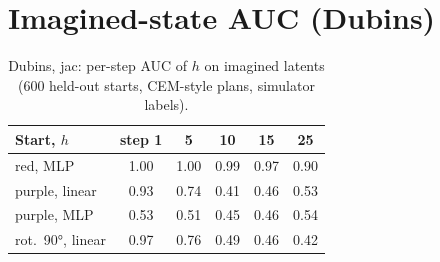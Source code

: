 \documentclass{article}
\begin{document}
\section{Imagined-state AUC (Dubins)}
\label{app:imag}
\begin{table}[t]\centering\small
\caption{Dubins, jac: per-step AUC of $h$ on imagined latents (600 held-out starts, CEM-style plans, simulator labels).}
\label{tab:imag_decay}
\begin{tabular}{lccccc}
\toprule
Start, $h$ & step 1 & 5 & 10 & 15 & 25 \\
\midrule
red, MLP & 1.00 & 1.00 & 0.99 & 0.97 & 0.90 \\
purple, linear & 0.93 & 0.74 & 0.41 & 0.46 & 0.53 \\
purple, MLP & 0.53 & 0.51 & 0.45 & 0.46 & 0.54 \\
rot.\ 90°, linear & 0.97 & 0.76 & 0.49 & 0.46 & 0.42 \\
\bottomrule
\end{tabular}
\end{table}
\end{document}
